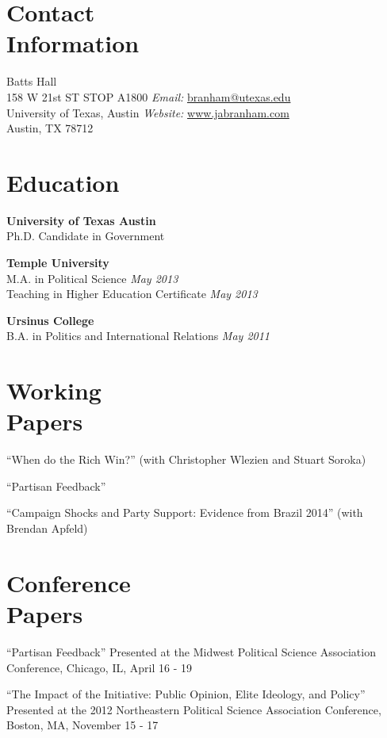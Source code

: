 \documentclass[margin,line]{res}
\newenvironment{list2}{
    \begin{list}{--}{%
        \setlength{\itemsep}{0in}
        \setlength{\parsep}{0in} \setlength{\parskip}{0in}
        \setlength{\topsep}{0in} \setlength{\partopsep}{0in}
        \setlength{\leftmargin}{0.2in}}}{\end{list}}
\begin{document}

\begin{resume}


\section{\sc Contact \\Information}
Batts Hall               \hfill     \\
158 W 21st ST STOP A1800                     \hfill    {\em Email:}    \href{mailto:branham@utexas.edu}{branham@utexas.edu} \\
University of Texas, Austin     \hfill    {\em Website:}   \href{www.jabranham.com}{www.jabranham.com} \\
Austin, TX 78712                  \hfill


\section{\sc Education}
{\bf University of Texas Austin}     \hfill     \\
 Ph.D. Candidate in Government       \hfill 

{\bf Temple University} \hfill  \\
M.A. in Political Science  \hfill     {\em  May 2013} \\
Teaching in Higher Education Certificate \hfill {\em May 2013}

{\bf Ursinus College}   \hfill     \\ 
B.A. in Politics and International Relations    \hfill      {\em May 2011} \\

\section{\sc Working\\Papers}
\begin{list2}
	\item ``When do the Rich Win?'' (with Christopher Wlezien and Stuart Soroka)
	\item ``Partisan Feedback''
	\item ``Campaign Shocks and Party Support: Evidence from Brazil 2014'' (with Brendan Apfeld)
\end{list2}

\section{\sc Conference\\Papers}
\begin{list2}
	\item ``Partisan Feedback'' Presented at the Midwest Political Science Association Conference, Chicago, IL, April 16 - 19
	\item ``The Impact of the Initiative: Public Opinion, Elite Ideology, and Policy'' Presented at the 2012 Northeastern Political Science Association Conference, Boston, MA, November 15 - 17
\end{list2}


\end{resume}
\end{document}
